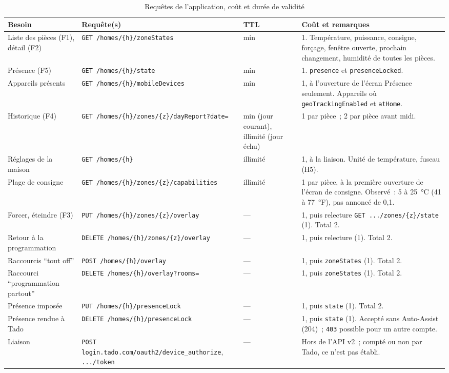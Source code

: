 \begin{table}[H]
  \centering\small
  \begin{tabularx}{\linewidth}{@{}>{\raggedright\arraybackslash}p{30mm}>{\raggedright\arraybackslash}p{58mm}>{\raggedright\arraybackslash}p{16mm}X@{}}
    \toprule
    \textbf{Besoin} & \textbf{Requête(s)} & \textbf{TTL} & \textbf{Coût et remarques} \\
    \midrule
    Liste des pièces (F1), détail (F2) & \texttt{GET /homes/\{h\}/zoneStates} & 5 min & 1. Température, puissance, consigne, forçage, fenêtre ouverte, prochain changement, humidité de toutes les pièces. \\
    Présence (F5) & \texttt{GET /homes/\{h\}/state} & 5 min & 1. \texttt{presence} et \texttt{presenceLocked}. \\
    Appareils présents & \texttt{GET /homes/\{h\}/mobileDevices} & 10 min & 1, à l'ouverture de l'écran Présence seulement. Appareils où \texttt{geoTrackingEnabled} et \texttt{atHome}. \\
    Historique (F4) & \texttt{GET /homes/\{h\}/zones/\{z\}/dayReport?date=} & 30 min (jour courant), illimité (jour échu) & 1 par pièce~; 2 par pièce avant midi. \\
    Réglages de la maison & \texttt{GET /homes/\{h\}} & illimité & 1, à la liaison. Unité de température, fuseau (H5). \\
    Plage de consigne & \texttt{GET /homes/\{h\}/zones/\{z\}/capabilities} & illimité & 1 par pièce, à la première ouverture de l'écran de consigne. Observé~: 5 à 25~°C (41 à 77~°F), pas annoncé de 0,1. \\
    Forcer, éteindre (F3) & \texttt{PUT /homes/\{h\}/zones/\{z\}/overlay} & --- & 1, puis relecture \texttt{GET .../zones/\{z\}/state} (1). Total 2. \\
    Retour à la programmation & \texttt{DELETE /homes/\{h\}/zones/\{z\}/overlay} & --- & 1, puis relecture (1). Total 2. \\
    Raccourcis \enquote{tout off} & \texttt{POST /homes/\{h\}/overlay} & --- & 1, puis \texttt{zoneStates} (1). Total 2. \\
    Raccourci \enquote{programmation partout} & \texttt{DELETE /homes/\{h\}/overlay?rooms=} & --- & 1, puis \texttt{zoneStates} (1). Total 2. \\
    Présence imposée & \texttt{PUT /homes/\{h\}/presenceLock} & --- & 1, puis \texttt{state} (1). Total 2. \\
    Présence rendue à Tado & \texttt{DELETE /homes/\{h\}/presenceLock} & --- & 1, puis \texttt{state} (1). Accepté sans Auto-Assist (204)~; \texttt{403} possible pour un autre compte. \\
    Liaison & \texttt{POST login.tado.com/oauth2/device\_authorize}, \texttt{.../token} & --- & Hors de l'API v2~; compté ou non par Tado, ce n'est pas établi. \\
    \bottomrule
  \end{tabularx}
  \caption{Requêtes de l'application, coût et durée de validité}
  \label{tab:requetes}
\end{table}

